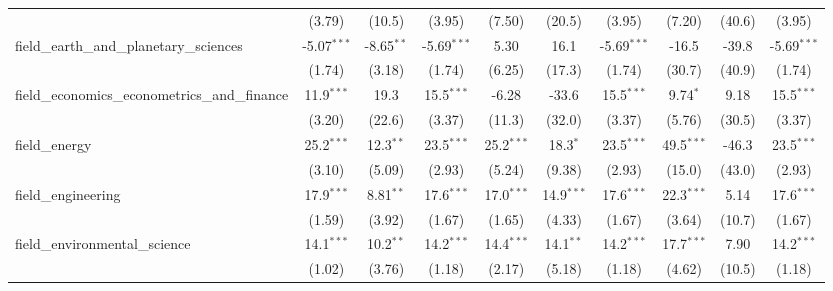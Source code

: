 \begin{tabular}{lccccccccc}
                                                               & (3.79)        & (10.5)        & (3.95)        & (7.50)        & (20.5)         & (3.95)        & (7.20)        & (40.6)        & (3.95)\\   
   field\_earth\_and\_planetary\_sciences                      & -5.07$^{***}$ & -8.65$^{**}$  & -5.69$^{***}$ & 5.30          & 16.1           & -5.69$^{***}$ & -16.5         & -39.8         & -5.69$^{***}$\\   
                                                               & (1.74)        & (3.18)        & (1.74)        & (6.25)        & (17.3)         & (1.74)        & (30.7)        & (40.9)        & (1.74)\\   
   field\_economics\_econometrics\_and\_finance                & 11.9$^{***}$  & 19.3          & 15.5$^{***}$  & -6.28         & -33.6          & 15.5$^{***}$  & 9.74$^{*}$    & 9.18          & 15.5$^{***}$\\   
                                                               & (3.20)        & (22.6)        & (3.37)        & (11.3)        & (32.0)         & (3.37)        & (5.76)        & (30.5)        & (3.37)\\   
   field\_energy                                               & 25.2$^{***}$  & 12.3$^{**}$   & 23.5$^{***}$  & 25.2$^{***}$  & 18.3$^{*}$     & 23.5$^{***}$  & 49.5$^{***}$  & -46.3         & 23.5$^{***}$\\   
                                                               & (3.10)        & (5.09)        & (2.93)        & (5.24)        & (9.38)         & (2.93)        & (15.0)        & (43.0)        & (2.93)\\   
   field\_engineering                                          & 17.9$^{***}$  & 8.81$^{**}$   & 17.6$^{***}$  & 17.0$^{***}$  & 14.9$^{***}$   & 17.6$^{***}$  & 22.3$^{***}$  & 5.14          & 17.6$^{***}$\\   
                                                               & (1.59)        & (3.92)        & (1.67)        & (1.65)        & (4.33)         & (1.67)        & (3.64)        & (10.7)        & (1.67)\\   
   field\_environmental\_science                               & 14.1$^{***}$  & 10.2$^{**}$   & 14.2$^{***}$  & 14.4$^{***}$  & 14.1$^{**}$    & 14.2$^{***}$  & 17.7$^{***}$  & 7.90          & 14.2$^{***}$\\   
                                                               & (1.02)        & (3.76)        & (1.18)        & (2.17)        & (5.18)         & (1.18)        & (4.62)        & (10.5)        & (1.18)\\   

\end{tabular}
